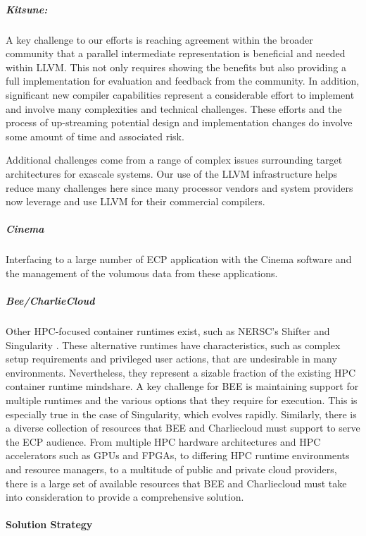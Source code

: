 \subparagraph{Kitsune:}
A key challenge to our efforts is reaching agreement within the broader community that
a parallel intermediate representation is beneficial and needed within
LLVM.  This not only requires showing the benefits but also providing a
full implementation for evaluation and feedback from the community.
In addition, significant new compiler capabilities represent a
considerable effort to implement and involve many complexities and technical
challenges.  These efforts and the process of up-streaming potential
design and implementation changes do involve some amount of time and
associated risk. 

Additional challenges come from a range of complex issues surrounding
target architectures for exascale systems.  Our use of the LLVM
infrastructure helps reduce many challenges here since many processor
vendors and system providers now leverage and use LLVM for their
commercial compilers.

\subparagraph{Cinema}
Interfacing to a large number of ECP application with the Cinema
software and the management of the volumous data from these
applications. 

\subparagraph{Bee/CharlieCloud}
Other HPC-focused container runtimes exist, such as NERSC's Shifter
\cite{canonrsjacobsend} and
Singularity \cite{kurtzergmsochatvbauermw}.  These alternative runtimes have characteristics, such as
complex setup requirements and privileged user actions, that are undesirable in
many environments.  Nevertheless, they represent a sizable fraction of the
existing HPC container runtime mindshare.  A key challenge for BEE is
maintaining support for multiple runtimes and the various options that they require
for execution.  This is especially true in the case of Singularity, which
evolves rapidly.  Similarly, there is a diverse collection of resources that
BEE and Charliecloud must support to serve the ECP audience.  From multiple HPC
hardware architectures and HPC accelerators such as GPUs and FPGAs, to
differing HPC runtime environments and resource managers, to a multitude of
public and private cloud providers, there is a large set of available resources
that BEE and Charliecloud must take into consideration to provide a
comprehensive solution.

\paragraph{Solution Strategy} \leavevmode \\

